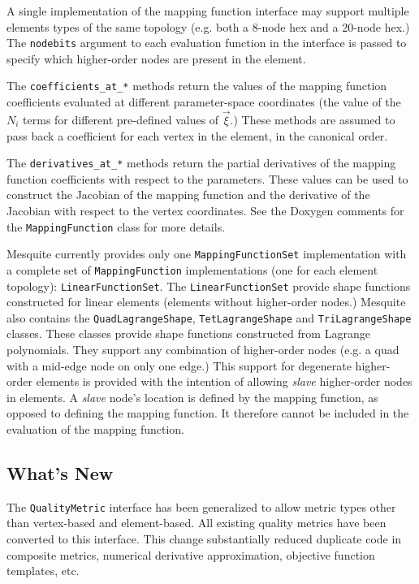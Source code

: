 \documentclass{article}
\begin{document}
A single implementation of the mapping function interface may support multiple elements types of the same topology (e.g. both a 8-node hex and a 20-node hex.)  The \texttt{nodebits} argument to each evaluation function in the interface is passed to specify which higher-order nodes are present in the element.  

The \texttt{coefficients\_at\_*} methods return the values of the mapping function coefficients evaluated at different parameter-space coordinates (the value of the $N_i$ terms for different pre-defined values of $\vec{\xi}$.)  These methods are assumed to pass back a coefficient for each vertex in the element, in the canonical order.

The \texttt{derivatives\_at\_*} methods return the partial derivatives of the mapping function coefficients with respect to the parameters.  These values can be used to construct the Jacobian of the mapping function and the derivative of the Jacobian with respect to the vertex coordinates.  See the Doxygen comments for the \texttt{MappingFunction} class for more details.

Mesquite currently provides only one \texttt{MappingFunctionSet} implementation with a complete set of \texttt{MappingFunction} implementations (one for each element topology): \texttt{LinearFunctionSet}.  The \texttt{LinearFunctionSet} provide shape functions constructed for linear elements (elements without higher-order nodes.)  Mesquite also contains the \texttt{QuadLagrangeShape}, \texttt{TetLagrangeShape} and \texttt{TriLagrangeShape} classes.  These classes provide shape functions constructed from Lagrange polynomials.  They support any combination of higher-order nodes (e.g. a quad with a mid-edge node on only one edge.)  This support for degenerate higher-order elements is provided with the intention of allowing \emph{slave} higher-order nodes in elements.  A \emph{slave} node's location is defined by the mapping function, as opposed to defining the mapping function.  It therefore cannot be included in the evaluation of the mapping function.


\subsection{What's New}

The \texttt{QualityMetric} interface has been generalized to allow metric types other than vertex-based and element-based.  All existing quality metrics have been converted to this interface.  This change substantially reduced duplicate code in composite metrics, numerical derivative approximation, objective function templates, etc.
\end{document}
